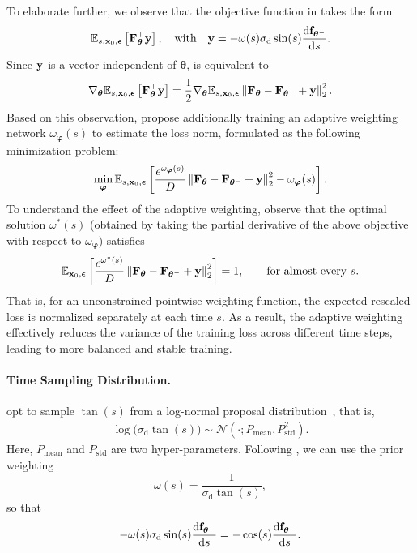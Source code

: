 To elaborate further, we observe that the objective function in  takes the form 
\[
\mathbb{E}_{s, {\mathbf{x}}_0, \bm{\epsilon}} \left[{\mathbf{F}}_{\bm{\theta}}^\top {\mathbf{y}} \right],\quad\text{with}\quad {\mathbf{y}}=-\omega(s) \sigma_{\mathrm{d}} \sin(s)\frac{\mathop{}\!\mathrm{d} {\mathbf{f}}_{\bm{\theta}^-}}{\mathop{}\!\mathrm{d} s}.
\]
Since ${\mathbf{y}}$ is a vector independent of $\bm{\theta}$,  is equivalent to
\begin{align*}
    \nabla_{\bm{\theta}} \mathbb{E}_{s, {\mathbf{x}}_0, \bm{\epsilon}} \left[{\mathbf{F}}_{\bm{\theta}}^\top {\mathbf{y}} \right]
    = \frac{1}{2} \nabla_{\bm{\theta}} \mathbb{E}_{s, {\mathbf{x}}_0, \bm{\epsilon}} \left\| {\mathbf{F}}_{\bm{\theta}} - {\mathbf{F}}_{\bm{\theta}^-} + {\mathbf{y}} \right\|_2^2.
\end{align*}
Based on this observation, \citet{lu2024simplifying} propose additionally training an adaptive weighting network $\omega_{\bm{\varphi}}(s)$ to estimate the loss norm, formulated as the following minimization problem:
\begin{align*}
    \min_{\bm{\varphi}} \mathbb{E}_{s, {\mathbf{x}}_0, \bm{\epsilon}} \left[ \frac{e^{\omega_{\bm{\varphi}}(s)}}{D} \left\| {\mathbf{F}}_{\bm{\theta}} - {\mathbf{F}}_{\bm{\theta}^-} + {\mathbf{y}} \right\|_2^2 - \omega_{\bm{\varphi}}(s) \right].
\end{align*}
To understand the effect of the adaptive weighting, observe that the optimal solution $\omega^*(s)$ (obtained by taking the partial derivative of the above objective with respect to $\omega_{\bm{\varphi}}$) satisfies
\begin{align}\label{eq:effect-adaptive-wgt}
    \mathbb{E}_{{\mathbf{x}}_0,\bm{\epsilon}}
    \left[
    \frac{e^{\omega^*(s)}}{D}
    \left\|
    {\mathbf{F}}_{\bm{\theta}}
    - {\mathbf{F}}_{\bm{\theta}^-}
    + {\mathbf{y}}
    \right\|_2^2
    \right]
    = 1,
    \qquad \text{for almost every } s.
\end{align}
That is, for an unconstrained pointwise weighting function, the expected
rescaled loss is normalized separately at each time $s$. As a result, the adaptive weighting effectively reduces the variance of the training loss across different time steps, leading to more balanced and stable training.

\paragraph{Time Sampling Distribution.} \citet{lu2024simplifying} opt to sample $\tan(s)$ from a log-normal proposal distribution~\citep{karras2022elucidating}, that is,
\begin{align}\label{eq:s-dist}
    \log\big(\sigma_{\mathrm{d}} \tan(s)\big) \sim \mathcal{N}(\cdot;P_{\text{mean}}, P_{\text{std}}^2).
\end{align}
Here, $P_{\text{mean}}$ and $P_{\text{std}}$ are two hyper-parameters. Following \citet{lu2024simplifying}, we can use the prior weighting
\[
\omega(s)=\frac{1}{\sigma_{\mathrm{d}}\tan(s)},
\]
so that
\[
-\omega(s)\sigma_{\mathrm{d}}\sin(s)
\frac{\mathop{}\!\mathrm{d}{\mathbf{f}}_{\bm{\theta}^-}}{\mathop{}\!\mathrm{d} s}
=
-\cos(s)\frac{\mathop{}\!\mathrm{d}{\mathbf{f}}_{\bm{\theta}^-}}{\mathop{}\!\mathrm{d} s}.
\]


